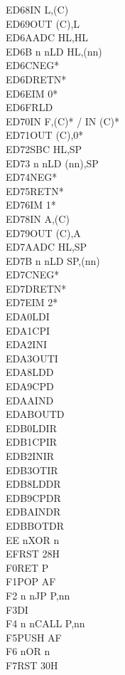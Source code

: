 \documentclass[oneside,a4paper]{book}
\begin{document}
\begin{multicols}{3}
{\begin{tabbing}
ED68\>IN L,(C)\\
ED69\>OUT (C),L\\
ED6A\>ADC HL,HL\\
ED6B n n\>LD HL,(nn)\\
ED6C\>NEG*\\
ED6D\>RETN*\\
ED6E\>IM 0*\\
ED6F\>RLD\\
ED70\>IN F,(C)* / IN (C)*\\
ED71\>OUT (C),0*\\
ED72\>SBC HL,SP\\
ED73 n n\>LD (nn),SP\\
ED74\>NEG*\\
ED75\>RETN*\\
ED76\>IM 1*\\
ED78\>IN A,(C)\\
ED79\>OUT (C),A\\
ED7A\>ADC HL,SP\\
ED7B n n\>LD SP,(nn)\\
ED7C\>NEG*\\
ED7D\>RETN*\\
ED7E\>IM 2*\\
EDA0\>LDI\\
EDA1\>CPI\\
EDA2\>INI\\
EDA3\>OUTI\\
EDA8\>LDD\\
EDA9\>CPD\\
EDAA\>IND\\
EDAB\>OUTD\\
EDB0\>LDIR\\
EDB1\>CPIR\\
EDB2\>INIR\\
EDB3\>OTIR\\
EDB8\>LDDR\\
EDB9\>CPDR\\
EDBA\>INDR\\
EDBB\>OTDR\\
EE n\>XOR n\\
EF\>RST 28H\\
F0\>RET P\\
F1\>POP AF\\
F2 n n\>JP P,nn\\
F3\>DI\\
F4 n n\>CALL P,nn\\
F5\>PUSH AF\\
F6 n\>OR n\\
F7\>RST 30H\\

\end{tabbing}}
\end{multicols}
\end{document}

